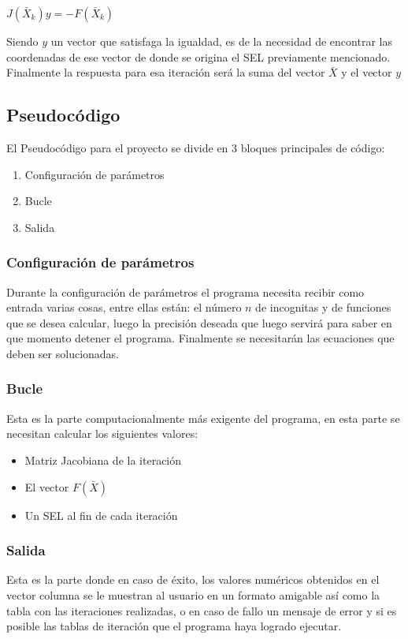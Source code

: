 ﻿\documentclass[11pt]{article}
\begin{document}
\begin{center}
$J(\bar{X}_{k})y = -F(\bar{X}_{k}) $
\end{center}

Siendo $y$ un vector que satisfaga la igualdad, es de la necesidad de encontrar las coordenadas de ese vector de donde se origina el SEL previamente mencionado. Finalmente la respuesta para esa iteración será la suma del vector $\bar{X}$ y el vector $y$


\subsection{Pseudocódigo}
El Pseudocódigo para el proyecto se divide en 3 bloques principales de código:
\begin{enumerate}
  \item Configuración de parámetros
  \item Bucle
  \item Salida
\end{enumerate}

\subsubsection{Configuración de parámetros}
Durante la configuración de parámetros el programa necesita recibir como entrada varias cosas, entre ellas están: el número  $n$ de incognitas y de funciones que se desea calcular, luego la precisión deseada que luego servirá para saber en que momento detener el programa. Finalmente se necesitarán las ecuaciones que deben ser solucionadas.

\subsubsection{Bucle}
Esta es la parte computacionalmente más exigente del programa, en esta parte se necesitan calcular los siguientes valores:
\begin{itemize}
  \item Matriz Jacobiana de la iteración
  \item El vector $F(\bar{X})$
  \item Un SEL al fin de cada iteración
\end{itemize}
\subsubsection{Salida}
Esta es la parte donde en caso de éxito, los valores numéricos obtenidos en el vector columna se le muestran al usuario en un formato amigable así como la tabla con las iteraciones realizadas, o en caso de fallo un mensaje de error y si es posible las tablas de iteración que el programa haya logrado ejecutar.  
\clearpage

\nocite{*}

\end{document}
